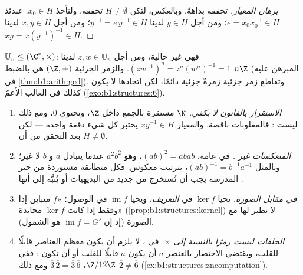 \begin{proof}[برهان المعيار]
 تحققه بداهةً. وبالعكس، لتكن $H \neq \emptyset$
تحققه، ولنأخذ $x_0 \in H$. عندئذ $e = x_0 x_0^{-1} \in H$؛ ومن أجل
$y \in H$ لدينا $y^{-1} = e\,y^{-1} \in H$؛ ومن أجل $x, y \in H$ لدينا $xy =
x (y^{-1})^{-1} \in H$.
\end{proof}

\begin{example}\label{ex:b1:structures:subgroups}
$\mathbb{U}_n \leq (\C^*, \times)$: فهي غير خالية، ومن أجل $z, w \in
\mathbb{U}_n$ لدينا $(zw^{-1})^n = z^n (w^n)^{-1} = 1$. والزمر الجزئية
 $(\Z, +)$ هي بالضبط $n\Z$ (المبرهن عليه في
\cref{thm:b1:arith:gcd}). وتقاطع زمر جزئية زمرةٌ جزئية دائمًا،
لكن اتحادها لا يكون كذلك في الغالب الأعمّ
(\cref{exo:b1:structures:6}).
\end{example}

\begin{remark}\label{rem:b1:structures:pitfalls}
\begin{enumerate}
  \item \emph{الاستقرار بالقانون لا يكفي.}  $\N$
        مستقرة بالجمع داخل $\Z$، وتحتوي $0$، ومع ذلك ليست
        : فالمقلوبات ناقصة. والمعيار
        $xy^{-1} \in H$ يختبر كل شيء دفعة واحدة --- لكن بعد
        التحقق من أن $H \neq \emptyset$.
  \item \emph{المنعكسات غير .} في  عامة، $(ab)^2 =
        abab$، وهو $a^2b^2$ عندما يتبادل $a$ و $b$ لا غير؛
        وبالمثل $(ab)^{-1} = b^{-1}a^{-1}$، بترتيب معكوس.
        فكل متطابقة مستوردة من جبر المدرسة يجب
        أن تُستخرج من جديد من البديهيات أو يُنبَّه إلى أنها .
  \item \emph{ في مقابل الصورة.} تحيا $\ker f$ في
        \emph{ التعريف}، ويحيا $\operatorname{im} f$ في  الوصول؛
         «$f$ متباين إذا وفقط إذا كانت $\ker f$ محايدة»
        (\cref{prop:b1:structures:kernel}) لا نظير لها مع الصورة (إذ إن $\operatorname{im} f = G'$ هو الشمول).
  \item \emph{الحلقات ليست زمرًا بالنسبة إلى $\times$.} في ، لا يلزم أن
        يكون معظم العناصر قابلًا للقلب، ويقتضي الاختصار بالعنصر $a$ أن يكون $a$ قابلًا للقلب أو أن تكون :
        ففي $\Z/12\Z$، $\overline3\,\overline2 =
        \overline3\,\overline6$ ومع ذلك $\overline2 \neq \overline6$
        (\cref{ex:b1:structures:zncomputation}).
\end{enumerate}
\end{remark}

